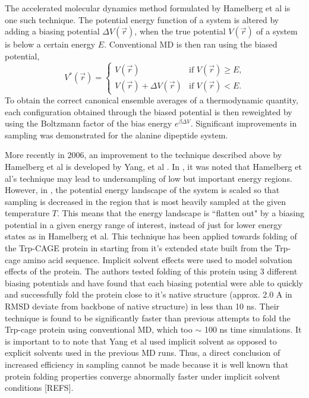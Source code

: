 \documentclass[12pt]{article}
\numberwithin{equation}{subsection}
\begin{document}
\begin{spacing}{1}
The accelerated molecular dynamics method formulated by Hamelberg et al \cite{amd} is one such technique. The potential energy function of a system is altered by adding a biasing potential $\Delta V(\overrightarrow{r})$, when the true potential $V(\overrightarrow{r})$ of a system is below a certain energy $E$. Conventional MD is then ran using the biased potential,
\begin{equation}
V^*(\overrightarrow{r})= 
\begin{cases} V(\overrightarrow{r}) & \text{if $V(\overrightarrow{r}) \geq E$,}
\\
V(\overrightarrow{r})+\Delta V(\overrightarrow{r}) &\text{if $V(\overrightarrow{r}) < E$.}
\end{cases}
\end{equation}
To obtain the correct canonical ensemble averages of a thermodynamic quantity, each configuration obtained through the biased potential is then reweighted by using the Boltzmann factor of the bias energy $e^{\beta\Delta V}$.  Significant improvements in sampling was demonstrated for the alanine dipeptide system.

More recently in 2006, an improvement to the technique described above by Hamelberg et al is developed by Yang, et al \cite{yang,yang_app}. In \cite{yang_app}, it was noted that Hamelberg et al's technique may lead to undersampling of low but important energy regions. However, in \cite{yang}, the potential energy landscape of the system is scaled so that sampling is decreased in the region that is most heavily sampled at the given temperature $T$. This means that the energy landscape is ``flatten out" by a biasing potential in a given energy range of interest, instead of just for lower energy states as in Hamelberg et al.  This technique has been applied towards folding of the Trp-CAGE protein in \cite{yang_app} starting from it's extended state built from the Trp-cage amino acid sequence. Implicit solvent effects were used to model solvation effects of the protein. The authors tested folding of this protein using 3 different biasing potentials and have found that each biasing potential were able to quickly and successfully fold the protein close to it's native structure (approx. 2.0 A in RMSD deviate from backbone of native structure) in less than 10 ns. Their technique is found to be significantly faster than previous attempts to fold the Trp-cage protein using conventional MD, which too $\sim$ 100 ns time simulations.  It is important to to note that Yang et al used implicit solvent as opposed to explicit solvents used in the previous MD runs. Thus, a direct conclusion of increased efficiency in sampling cannot be made because it is well known that protein folding properties converge abnormally faster under implicit solvent conditions [REFS].


\end{spacing}
\end{document}
